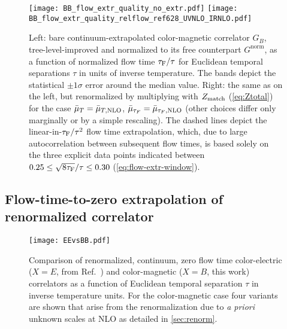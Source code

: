 \documentclass[floatfix,twocolumn,prd,showpacs,preprintnumbers,amsmath,nofootinbib,amssymb,superscriptaddress]{revtex4-2}
\def\ccite#1{Ref.~\cite{#1}} %
\begin{document}
\begin{figure*}
\centerline{
    \null \hfill
    \texttt{[image: BB\_flow\_extr\_quality\_no\_extr.pdf]}\hspace{2.1cm}
    \texttt{[image: BB\_flow\_extr\_quality\_relflow\_ref628\_UVNLO\_IRNLO.pdf]}
     \hfill\null
    }
    \caption{Left: bare continuum-extrapolated color-magnetic correlator $G_B$, tree-level-improved and normalized to its free counterpart $G^\text{norm}$, as a function of normalized flow time $\tau_\mathrm{F}/\tau$ for Euclidean temporal separations $\tau$ in units of inverse temperature. The bands depict the statistical $\pm 1 \sigma$ error around the median value. Right: the same as on the left, but renormalized by multiplying with $Z_{\mathrm{match}}$ (\cref{eq:Ztotal}) for the case $\bar{\mu}_{T}=\bar{\mu}_{T,\mathrm{NLO}}$, $\bar{\mu}_{\tau_F}=\bar{\mu}_{\tau_F,\mathrm{NLO}}$ (other choices differ only marginally or by a simple rescaling). The dashed lines depict the linear-in-$\tau_\mathrm{F}/\tau^2$ flow time extrapolation, which, due to large autocorrelation between subsequent flow times, is based solely on the three explicit data points indicated between $0.25 \leq \sqrt{8\tau_\mathrm{F}}/\tau \leq 0.30$ (\cref{eq:flow-extr-window}).}
    \label{fig:flow-extrapo}
\end{figure*}

\subsection{Flow-time-to-zero extrapolation of renormalized correlator}

\begin{figure}[b]
    \centering
    \texttt{[image: EEvsBB.pdf]}
    \caption{Comparison of renormalized, continuum, zero flow time color-electric ($X=E$, from \ccite{Altenkort:2020fgs}) and color-magnetic ($X=B$, this work) correlators as a function of Euclidean temporal separation $\tau$ in inverse temperature units. For the color-magnetic case four variants are shown that arise from the renormalization due to \textit{a priori} unknown scales at NLO as detailed in \cref{sec:renorm}.
    }
    \label{fig:EEvsBB}
\end{figure}
\end{document}
